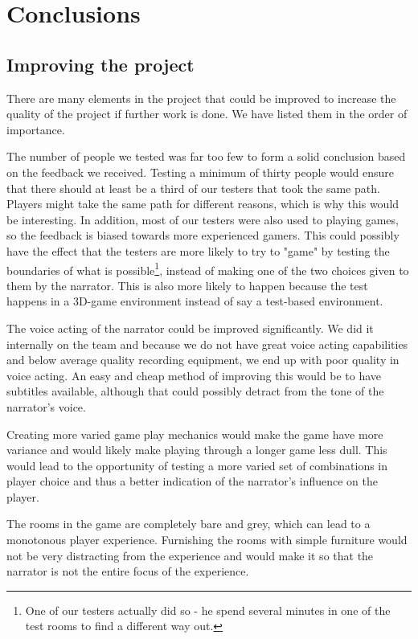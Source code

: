 \section{Conclusions}

\subsection{Improving the project}
There are many elements in the project that could be improved to increase the quality of the project if further work is done. We have listed them in the order of importance.

The number of people we tested was far too few to form a solid conclusion based on the feedback we received. Testing a minimum of thirty people would ensure that there should at least be a third of our testers that took the same path. Players might take the same path for different reasons, which is why this would be interesting. In addition, most of our testers were also used to playing games, so the feedback is biased towards more experienced gamers. This could possibly have the effect that the testers are more likely to try to "game" by testing the boundaries of what is possible\footnote{One of our testers actually did so - he spend several minutes in one of the test rooms to find a different way out.}, instead of making one of the two choices given to them by the narrator. This is also more likely to happen because the test happens in a 3D-game environment instead of say a test-based environment.

The voice acting of the narrator could be improved significantly. We did it internally on the team and because we do not have great voice acting capabilities and below average quality recording equipment, we end up with poor quality in voice acting. An easy and cheap method of improving this would be to have subtitles available, although that could possibly detract from the tone of the narrator's voice.

Creating more varied game play mechanics would make the game have more variance and would likely make playing through a longer game less dull. This would lead to the opportunity of testing a more varied set of combinations in player choice and thus a better indication of the narrator's influence on the player.

The rooms in the game are completely bare and grey, which can lead to a monotonous player experience. Furnishing the rooms with simple furniture would not be very distracting from the experience and would make it so that the narrator is not the entire focus of the experience.

